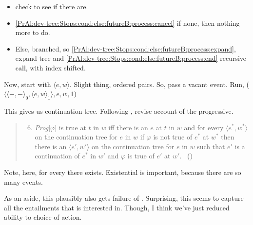 \begin{note}
\begin{itemize}
\begin{itemize}
\begin{itemize}
        \begin{itemize}
        \item
          \label{PrAl:dev-tree:Stops:cond:else:futureB:process:start} check to see if there are.
        \item
          \autoref{PrAl:dev-tree:Stops:cond:else:futureB:process:cancel} if none, then nothing more to do.
        \item
          Else, branched, so \autoref{PrAl:dev-tree:Stops:cond:else:futureB:process:expand}, expand tree and \autoref{PrAl:dev-tree:Stops:cond:else:futureB:process:end} recursive call, with index shifted.
        \end{itemize}
      \end{itemize}
    \end{itemize}
  \end{itemize}
  Now, start with \(\langle e,w \rangle\).
  Slight thing, ordered pairs.
  So, pass a vacant event.
  Run, \AlgDevelopTree{}(\(\langle \langle -,- \rangle_{0}, \langle e,w \rangle_{1} \rangle, e, w, 1\))
\end{note}

\begin{note}
  This gives us continuation tree.
  Following \citeauthor{Szabo:2004ul}, revise account of the progressive.

  \begin{quote}
    \begin{enumerate}[label=(\Roman*), ref=(\Roman*)]
      \setcounter{enumi}{5}
    \item
      \emph{Prog}[\(\varphi\)] is true at \(t\) in \(w\) iff there is an \(e\) at \(t\) in \(w\) and for every \(\langle e^{\ast}, w^{\ast} \rangle\) on the continuation tree for \(e\) in \(w\) if \(\varphi\) is not true of \(e^{\ast}\) at \(w^{\ast}\) then there is an \(\langle e', w' \rangle\) on the continuation tree for \(e\) in \(w\) such that \(e'\) is a continuation of \(e^{\ast}\) in \(w'\) and \(\varphi\) is true of \(e'\) at \(w'\).%
      \mbox{ }\hfill\mbox{(\citeyear[37]{Szabo:2004ul})}
    \end{enumerate}
  \end{quote}

  Note, here, for every there exists.
  Existential is important, because there are so many events.

  As an aside, this plausibly also gets failure of \BoyVS{}.
  Surprising, this seems to capture all the entailments that \citeauthor{Boylan:2020aa} is interested in.
  Though, I think we've just reduced ability to choice of action.
\end{note}

